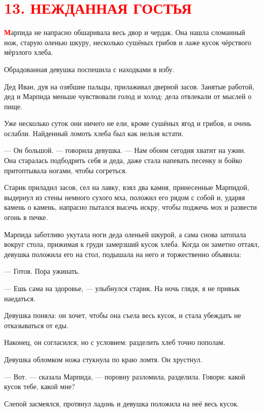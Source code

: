 \documentclass[12pt, a4paper, openany]{book}
\begin{document}
	
	
		\section[13. Нежданная гостья]{\center \textcolor{red}{13. НЕЖДАННАЯ ГОСТЬЯ}}
		
	
	\lettrine[findent=0pt]{\textbf{\textcolor{red}{М}}}{}арпида не напрасно обшаривала весь двор и чердак. Она нашла сломанный нож, старую оленью шкуру, несколько сушёных грибов и лаже кусок чёрствого мёрзлого хлеба.
	
	Обрадованная девушка поспешила с находками в избу.
	
	Дед Иван, дуя на озябшие пальцы, прилаживал дверной засов. Занятые работой, дед и Марпида меньше чувствовали голод и холод: дела отвлекали от мыслей о пище.
	
	Уже несколько суток они ничего не ели, кроме сушёных ягод и грибов, и очень ослабли. Найденный ломоть хлеба был как нельзя кстати.
	
	— Он большой. — говорила девушка. — Нам обоим сегодня хватит на ужин. Она старалась подбодрить себя и деда, даже стала напевать песенку и бойко притоптывала ногами, чтобы согреться.
	
	Старик приладил засов, сел на лавку, взял два камня, принесенные Марпидой, выдернул из стены немного сухого мха, положил его рядом с собой и, ударяя камень о камень, напрасно пытался высечь искру, чтобы поджечь мох и развести огонь в печке.
	
	Марпида заботливо укутала ноги деда оленьей шкурой, а сама снова затопала вокруг стола, прижимая к груди замерзший кусок хлеба. Когда он заметно оттаял, девушка положила его на стол, подышала на него и торжественно объявила:
	
	— Готов. Пора ужинать.
	
	— Ешь сама на здоровье, — улыбнулся старик. На ночь глядя, я не привык наедаться.
	
	Девушка поняла: он хочет, чтобы она съела весь кусок, и стала убеждать не отказываться от еды.
	
	Наконец, он согласился, но с условием: разделить хлеб точно пополам.
	
	Девушка обломком ножа стукнула по краю ломтя. Он хрустнул.
	
	— Вот. — сказала Марпида, — поровну разломила, разделила. Говори: какой кусок тебе, какой мне?
	
	Слепой засмеялся, протянул ладонь и девушка положила на неё весь кусок.
	
\end{document}
